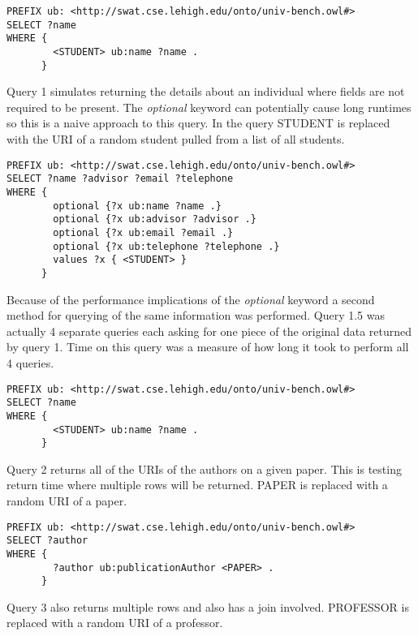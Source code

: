 \documentclass{llncs}
\begin{document}
\begin{lstlisting}[caption=Benchmark Query]
PREFIX ub: <http://swat.cse.lehigh.edu/onto/univ-bench.owl#>
SELECT ?name
WHERE {
        <STUDENT> ub:name ?name .
      }
\end{lstlisting}

\smallskip

Query 1 simulates returning the details about an individual where fields are not required to be present.  The \emph{optional} keyword can potentially cause long runtimes so this is a naive approach to this query.  In the query STUDENT is replaced with the URI of a random student pulled from a list of all students.

\clearpage

\begin{lstlisting}[caption=Query 1]
PREFIX ub: <http://swat.cse.lehigh.edu/onto/univ-bench.owl#>
SELECT ?name ?advisor ?email ?telephone
WHERE {
        optional {?x ub:name ?name .}
        optional {?x ub:advisor ?advisor .}
        optional {?x ub:email ?email .}
        optional {?x ub:telephone ?telephone .}
        values ?x { <STUDENT> }
      }
\end{lstlisting}

\smallskip

Because of the performance implications of the \emph{optional} keyword a second method for querying of the same information was performed.  Query 1.5 was actually 4 separate queries each asking for one piece of the original data returned by query 1.  Time on this query was a measure of how long it took to perform all 4 queries.

\begin{lstlisting}[caption=Sample of Query 1.5]
PREFIX ub: <http://swat.cse.lehigh.edu/onto/univ-bench.owl#>
SELECT ?name
WHERE {
        <STUDENT> ub:name ?name .
      }
\end{lstlisting}

\smallskip

Query 2 returns all of the URIs of the authors on a given paper.  This is testing return time where multiple rows will be returned.  PAPER is replaced with a random URI of a paper.

\begin{lstlisting}[caption=Query 2]
PREFIX ub: <http://swat.cse.lehigh.edu/onto/univ-bench.owl#>
SELECT ?author
WHERE {
        ?author ub:publicationAuthor <PAPER> .
      }
\end{lstlisting}
\smallskip

Query 3 also returns multiple rows and also has a join involved.  PROFESSOR is replaced with a random URI of a professor.
\end{document}
